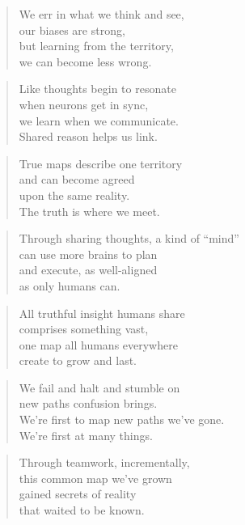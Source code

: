 \documentclass[14pt,a4paper]{article}
\begin{document}
\begin{verse}
We err in what we think and see,\\
our biases are strong,\\
but learning from the territory,\\
we can become less wrong.
\end{verse}

\begin{verse}
Like thoughts begin to resonate\\
when neurons get in sync,\\
we learn when we communicate.\\
Shared reason helps us link.
\end{verse}

\begin{verse}
True maps describe one territory\\
and can become agreed\\
upon the same reality.\\
The truth is where we meet.
\end{verse}

\begin{verse}
Through sharing thoughts, a kind of “mind”\\
can use more brains to plan\\
and execute, as well-aligned\\
as only humans can.
\end{verse}

\begin{verse}
All truthful insight humans share\\
comprises something vast,\\
one map all humans everywhere\\
create to grow and last.
\end{verse}

\begin{verse}
We fail and halt and stumble on\\
new paths confusion brings.\\
We’re first to map new paths we’ve gone.\\
We’re first at many things.
\end{verse}

\begin{verse}
Through teamwork, incrementally,\\
this common map we’ve grown\\
gained secrets of reality\\
that waited to be known.
\end{verse}
\end{document}

